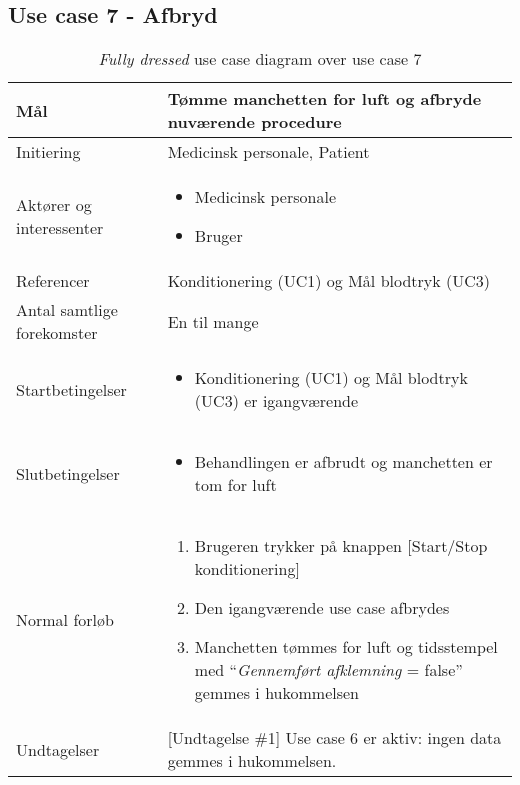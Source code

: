 	\subsection{Use case 7 - Afbryd}
	\begin{table}[H]
			\begin{center}
			\begin{tabular}{ | p{} | p{}| } 
				\hline
				Mål & Tømme manchetten for luft og afbryde nuværende procedure \\ 
				\hline
				Initiering &  Medicinsk personale, Patient\\
				\hline
				Aktører og interessenter & 
				\begin{itemize}
					\item Medicinsk personale 
					\item Bruger 
				\end{itemize} \\ 
				\hline
				Referencer & Konditionering (UC1) og Mål blodtryk (UC3) \\ 
				\hline
				Antal samtlige forekomster & En til mange \\ 
				\hline	
				Startbetingelser & 
				\begin{itemize}
					\item Konditionering (UC1) og Mål blodtryk (UC3) er igangværende 
 				\end{itemize} \\ 
				\hline
				Slutbetingelser & 
				\begin{itemize}
					\item Behandlingen er afbrudt og manchetten er tom for luft
				\end{itemize} \\ 
				\hline
				Normal forløb & \begin{enumerate}
					\setlength\itemsep{0cm} %
					\item Brugeren trykker på knappen [Start/Stop konditionering]
					\item Den igangværende use case afbrydes
					\item Manchetten tømmes for luft og tidsstempel med “\textit{Gennemført afklemning} = false” gemmes i hukommelsen
					\subitem[Undtagelse \#1]
				\end{enumerate} \\ 
				\hline
				Undtagelser & [Undtagelse \#1] Use case 6 er aktiv: ingen data gemmes i hukommelsen. \\ 
				\hline
			\end{tabular}
		\end{center}
			\caption{\textit{Fully dressed} use case diagram over use case 7}
		\end{table}
	\newpage

		